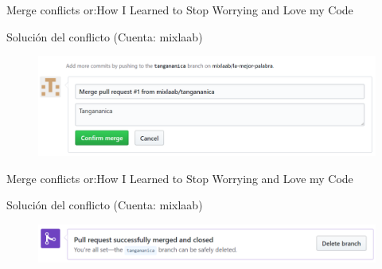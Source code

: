 \documentclass[10pt]{beamer}
\begin{document}
\begin{frame}{Merge conflicts or:}{How I Learned to Stop Worrying and Love my Code \heartsuit}

\begin{block}{Solución del conflicto (Cuenta: mixlaab)}

\begin{figure}[h!]
\centering
\includegraphics [scale=0.25]{merge2}
\label{fig:issues}
\end{figure}
    
\end{block}

\end{frame}

\begin{frame}{Merge conflicts or:}{How I Learned to Stop Worrying and Love my Code \heartsuit}

\begin{block}{Solución del conflicto (Cuenta: mixlaab)}

\begin{figure}[h!]
\centering
\includegraphics [scale=0.25]{merge3}
\label{fig:issues}
\end{figure}
    
\end{block}

\end{frame}
\end{document}
